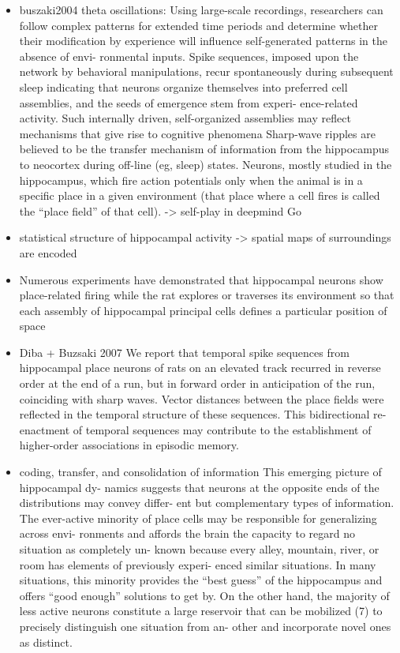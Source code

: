 \documentclass{article} %
\begin{document}
\begin{itemize}
\begin{itemize}
\item
buszaki2004 theta oscillations:
Using large-scale recordings, researchers can follow complex patterns for extended time periods and determine whether their modification by experience will influence self-generated patterns in the absence of envi- ronmental inputs. Spike sequences, imposed upon the network by behavioral manipulations, recur spontaneously during subsequent sleep
indicating that neurons organize themselves into preferred cell assemblies, and the seeds of emergence stem from experi- ence-related activity.
 Such internally driven, self-organized assemblies may reflect mechanisms that give rise to cognitive phenomena
 Sharp-wave ripples are believed to be the transfer mechanism of information from the hippocampus to neocortex during off-line (eg, sleep) states.
Neurons, mostly studied in the hippocampus, which fire action potentials only when the animal is in a specific place in a given environment (that place where a cell fires is called the “place field” of that cell).
-> self-play in deepmind Go

\item
statistical structure of hippocampal activity ->
spatial maps of surroundings are encoded

\item
Numerous experiments have demonstrated that hippocampal neurons show place-related firing while the rat explores or traverses its environment so that each assembly of hippocampal principal cells defines a particular position of space 

\item
Diba + Buzsaki 2007
We report that temporal spike sequences from hippocampal place neurons of rats on an elevated track recurred in reverse order at the end of a run, but in forward order in anticipation of the run, coinciding with sharp waves. Vector distances between the place fields were reflected in the temporal structure of these sequences. This bidirectional re-enactment of temporal sequences may contribute to the establishment of higher-order associations in episodic memory.

\item
coding, transfer, and consolidation of
information
This emerging picture of hippocampal dy- namics suggests that neurons at the opposite ends of the distributions may convey differ- ent but complementary types of information. The ever-active minority of place cells may be responsible for generalizing across envi- ronments and affords the brain the capacity to regard no situation as completely un- known because every alley, mountain, river, or room has elements of previously experi- enced similar situations. In many situations,
this minority provides the “best guess” of the hippocampus and offers “good enough” solutions to get by. On the other hand, the majority of less active neurons constitute a large reservoir that can be mobilized (7) to precisely distinguish one situation from an- other and incorporate novel ones as distinct.
\end{itemize}
\end{itemize}
\end{document}
